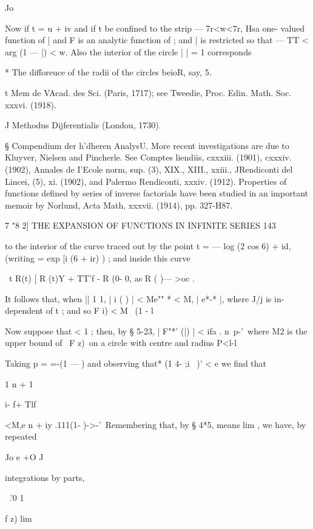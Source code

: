 {Jo

Now if t = u + iv and if t be confined to the strip — 7r<w<7r, Hsa
one- valued function of | and F is an analytic function of ; and | is
restricted so that — TT < arg (1 — |) < w. Also the interior of the
circle | | = 1 corresponds

* The difforeuce of the radii of the circles beioR, say, 5.

t Mem de VAcad. des Sci. (Paris, 1717); see Tweedie, Proc. Edin. Math.
Soc. xxxvi. (1918).

J Methodus Dijferentialis (Londou, 1730).

§ Compendium der h'dheren AnalysU. More recent investigations are due
to Kluyver, Nielsen and Pincherle. See Comptes liendiis, cxxxiii.
(1901), cxxxiv. (1902), Annales de I'Ecole norm, sup. (3), XIX.,
XIII., xxiii., JRendiconti del Lincei, (5), xi. (1902), and Palermo
Rendiconti, xxxiv. (1912). Properties of functions defined by series
of inverse factorials have been studied in an important memoir by
Norlund, Acta Math, xxxvii. (1914), pp. 327-H87.



7 "8 2] THE EXPANSION OF FUNCTIONS IN INFINITE SERIES 143



to the interior of the curve traced out by the point t = — log (2 cos
6) + id, (writing = exp [i (6 + ir) ) ; and inside this curve

\ t R(t) [ R (t)Y + TT'f - R (0- 0, as R ( )— >oc .

It follows that, when || 1 1, | i ( ) | < Me"" * < M, | e*-* |, where
J/j is in- dependent of t ; and so F i) < M \ (1 - l

Now suppose that < 1 ; then, by § 5-23, | F"*' (|) | < ifa . n\ p-'\
where M2 is the upper bound of \ F z)\ on a circle with centre and
radius P<l-l

Taking p = =-(1 — ) and observing that* (1 4- ;i~ )' < e we find that

1 n + 1



i- f+ Tlf



<M,e n + iy .111(1- )->-'\ Remembering that, by § 4*5, means lim , we
have, by repeated

Jo e +O J

integrations by parts,

\ .'0 1



f z) lim



}
